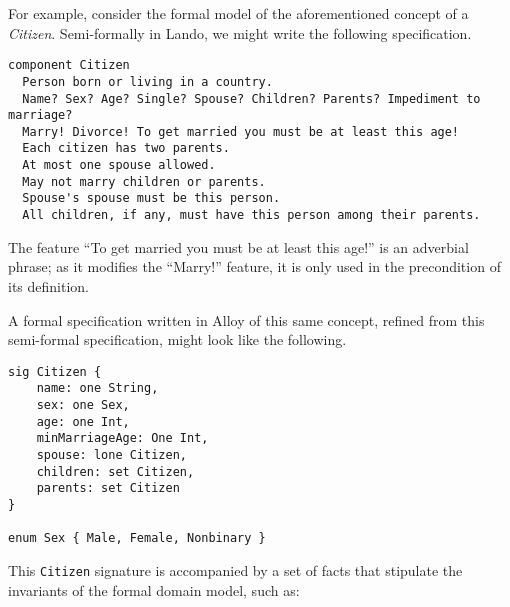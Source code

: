 \documentclass[10pt,letterpaper]{article}
\begin{document}

For example, consider the formal model of the aforementioned concept of a \emph{Citizen}.  Semi-formally in Lando, we might write the following specification.

\begin{lstlisting}
component Citizen
  Person born or living in a country.
  Name? Sex? Age? Single? Spouse? Children? Parents? Impediment to marriage?
  Marry! Divorce! To get married you must be at least this age!
  Each citizen has two parents.
  At most one spouse allowed.
  May not marry children or parents.
  Spouse's spouse must be this person.
  All children, if any, must have this person among their parents.
\end{lstlisting}

The feature ``To get married you must be at least this age!'' is an adverbial phrase; as it modifies the ``Marry!'' feature, it is only used in the precondition of its definition.

A formal specification written in Alloy of this same concept, refined from this semi-formal specification, might look like the following.

\begin{lstlisting}
sig Citizen {
    name: one String,
    sex: one Sex,
    age: one Int,
    minMarriageAge: One Int,
    spouse: lone Citizen,
    children: set Citizen,
    parents: set Citizen
}

enum Sex { Male, Female, Nonbinary }
\end{lstlisting}

This \texttt{Citizen} signature is accompanied by a set of facts that stipulate the invariants of the formal domain model, such as:
\end{document}

